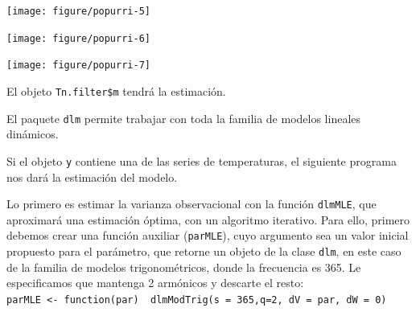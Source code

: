 \documentclass[12pt]{article}\usepackage[]{graphicx}\usepackage[]{color}
\newenvironment{knitrout}{}{} %
\begin{document}
\begin{knitrout}
{}




{\centering \texttt{[image: figure/popurri-5]} 

}




{\centering \texttt{[image: figure/popurri-6]} 

}




{\centering \texttt{[image: figure/popurri-7]} 

}



\end{knitrout}

\newpage

El objeto \verb|Tn.filter$m| tendrá la estimación.
% 
% 
 
El paquete \verb|dlm| permite trabajar con toda la familia de modelos lineales dinámicos. %

Si el objeto \verb|y| contiene una de las series de temperaturas, el siguiente programa nos dará la estimación del modelo.

Lo primero es estimar la varianza observacional con la función \verb|dlmMLE|, que aproximará una estimación óptima, con un algoritmo iterativo. Para ello, primero debemos crear una función auxiliar (\verb|parMLE|), cuyo argumento sea un valor inicial propuesto para el parámetro, que retorne un objeto de la clase \verb|dlm|, en este caso de la familia de modelos trigonométricos, donde la frecuencia es 365. Le especificamos que mantenga 2 armónicos y descarte el resto:\\
\verb|parMLE <- function(par)  dlmModTrig(s = 365,q=2, dV = par, dW = 0)|
\end{document}
